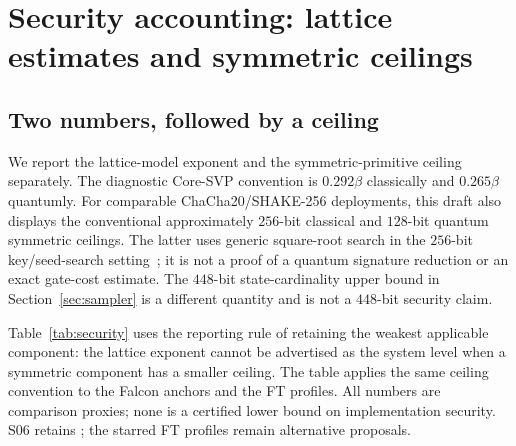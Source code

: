 \section{Security accounting: lattice estimates and symmetric ceilings}\label{sec:security}
\subsection{Two numbers, followed by a ceiling}
We report the lattice-model exponent and the symmetric-primitive
ceiling separately. The diagnostic Core-SVP convention is
$0.292\beta$ classically and $0.265\beta$ quantumly. For comparable
ChaCha20/SHAKE-256 deployments, this draft also displays the conventional
approximately $256$-bit classical and $128$-bit quantum symmetric
ceilings. The latter uses generic square-root search in the
$256$-bit key/seed-search setting~\cite{grover1996}; it is not a proof
of a quantum signature reduction or an exact gate-cost estimate.
The $448$-bit state-cardinality upper bound in
Section~\ref{sec:sampler} is a different quantity and is not a
$448$-bit security claim.

Table~\ref{tab:security} uses the reporting rule of retaining the weakest applicable component:
the lattice exponent cannot be advertised as the system level when
a symmetric component has a smaller ceiling. The table applies the
same ceiling convention to the Falcon anchors and the FT profiles.
All numbers are comparison proxies; none is a certified lower bound
on implementation security. S06 retains ;
the starred FT profiles remain alternative proposals.

